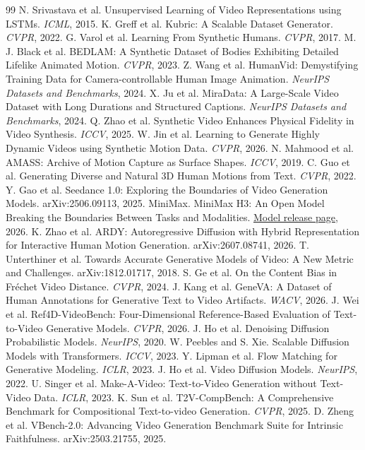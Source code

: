 \documentclass[10pt,twocolumn]{article}
\begin{document}
\balance
\begin{thebibliography}{99}\footnotesize
\setlength{\itemsep}{0pt}
\setlength{\parskip}{0pt}
 N. Srivastava et al. Unsupervised Learning of Video Representations using LSTMs. \emph{ICML}, 2015.
 K. Greff et al. Kubric: A Scalable Dataset Generator. \emph{CVPR}, 2022.
 G. Varol et al. Learning From Synthetic Humans. \emph{CVPR}, 2017.
 M. J. Black et al. BEDLAM: A Synthetic Dataset of Bodies Exhibiting Detailed Lifelike Animated Motion. \emph{CVPR}, 2023.
 Z. Wang et al. HumanVid: Demystifying Training Data for Camera-controllable Human Image Animation. \emph{NeurIPS Datasets and Benchmarks}, 2024.
 X. Ju et al. MiraData: A Large-Scale Video Dataset with Long Durations and Structured Captions. \emph{NeurIPS Datasets and Benchmarks}, 2024.
 Q. Zhao et al. Synthetic Video Enhances Physical Fidelity in Video Synthesis. \emph{ICCV}, 2025.
 W. Jin et al. Learning to Generate Highly Dynamic Videos using Synthetic Motion Data. \emph{CVPR}, 2026.
 N. Mahmood et al. AMASS: Archive of Motion Capture as Surface Shapes. \emph{ICCV}, 2019.
 C. Guo et al. Generating Diverse and Natural 3D Human Motions from Text. \emph{CVPR}, 2022.
 Y. Gao et al. Seedance 1.0: Exploring the Boundaries of Video Generation Models. arXiv:2506.09113, 2025.
 MiniMax. MiniMax H3: An Open Model Breaking the Boundaries Between Tasks and Modalities.
\href{https://www.minimax.io/blog/minimax-h3}{Model release page}, 2026.
 K. Zhao et al. ARDY: Autoregressive Diffusion with Hybrid Representation for Interactive Human Motion Generation. arXiv:2607.08741, 2026.
 T. Unterthiner et al. Towards Accurate Generative Models of Video: A New Metric and Challenges. arXiv:1812.01717, 2018.
 S. Ge et al. On the Content Bias in Fr\'echet Video Distance. \emph{CVPR}, 2024.
 J. Kang et al. GeneVA: A Dataset of Human Annotations for Generative Text to Video Artifacts. \emph{WACV}, 2026.
 J. Wei et al. Ref4D-VideoBench: Four-Dimensional Reference-Based Evaluation of Text-to-Video Generative Models. \emph{CVPR}, 2026.
 J. Ho et al. Denoising Diffusion Probabilistic Models. \emph{NeurIPS}, 2020.
 W. Peebles and S. Xie. Scalable Diffusion Models with Transformers. \emph{ICCV}, 2023.
 Y. Lipman et al. Flow Matching for Generative Modeling. \emph{ICLR}, 2023.
 J. Ho et al. Video Diffusion Models. \emph{NeurIPS}, 2022.
 U. Singer et al. Make-A-Video: Text-to-Video Generation without Text-Video Data. \emph{ICLR}, 2023.
 K. Sun et al. T2V-CompBench: A Comprehensive Benchmark for Compositional Text-to-video Generation. \emph{CVPR}, 2025.
 D. Zheng et al. VBench-2.0: Advancing Video Generation Benchmark Suite for Intrinsic Faithfulness. arXiv:2503.21755, 2025.
\end{thebibliography}
\end{document}
